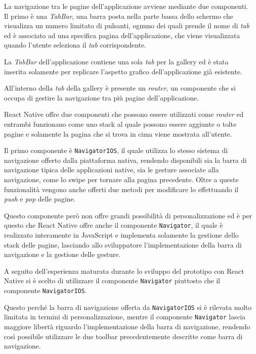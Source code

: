 La navigazione tra le pagine dell'applicazione avviene mediante due componenti.
Il primo è una \textit{TabBar}, una barra posta nella parte bassa dello schermo che visualizza un numero limitato di pulsanti, ognuno dei quali prende il nome di \textit{tab} ed è associato ad una specifica pagina dell'applicazione, che viene visualizzata quando l'utente seleziona il \textit{tab} corrispondente.

La \textit{TabBar} dell'applicazione contiene una sola \textit{tab} per la gallery ed è stata inserita solamente per replicare l'aspetto grafico dell'applicazione già esistente.

All'interno della \textit{tab} della gallery è presente un \textit{router}, un componente che si occupa di gestire la navigazione tra più pagine dell'applicazione. 

React Native offre due componenti che possono essere utilizzati come \textit{router} ed entrambi funzionano come uno stack al quale possono essere aggiunte o tolte pagine e solamente la pagina che si trova in cima viene mostrata all'utente.

Il primo componente è \texttt{NavigatorIOS}, il quale utilizza lo stesso sistema di navigazione offerto dalla piattaforma nativa, rendendo disponibili sia la barra di navigazione tipica delle applicazioni native, sia le gesture associate alla navigazione, come lo swipe per tornare alla pagina precedente.
Oltre a queste funzionalità vengono anche offerti due metodi per modificare lo effettuando il \textit{push} e \textit{pop} delle pagine.

Questo componente però non offre grandi possibilità di personalizzazione ed è per questo che React Native offre anche il componente \texttt{Navigator}, il quale è realizzato interamente in JavaScript e implementa solamente la gestione dello stack delle pagine, lasciando allo sviluppatore l'implementazione della barra di navigazione e la gestione delle gesture.

A seguito dell'esperienza maturata durante lo sviluppo del prototipo con React Native si è scelto di utilizzare il componente \texttt{Navigator} piuttosto che il componente \texttt{NavigatorIOS}.

Questo perché la barra di navigazione offerta da \texttt{NavigatorIOS} si è rilevata molto limitata in termini di personalizzazione, mentre il componente \texttt{Navigator} lascia maggiore libertà riguardo l'implementazione della barra di navigazione, rendendo così possibile utilizzare le due toolbar precedentemente descritte come barra di navigazione.
